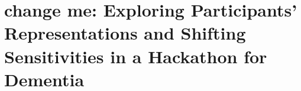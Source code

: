 \chapter{change me: Exploring Participants' Representations and Shifting Sensitivities in a Hackathon for Dementia}